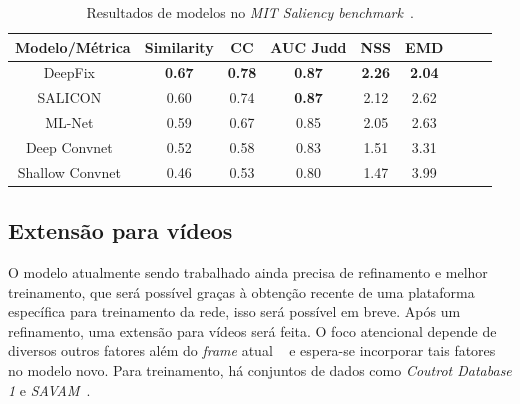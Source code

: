 \documentclass[11pt]{article}
\newcommand{\tit}[1]{\textit{#1}}
\newcommand{\tbf}[1]{\textbf{#1}}
\begin{document}
\begin{table}[H]
    \centering
    \caption{Resultados de modelos no \tit{MIT Saliency benchmark}~\cite{ref:mit300-bm}.}
    \begin{tabular}{|c|c|c|c|c|c|c|c|c|}
        \hline
        \tbf{Modelo/Métrica} & \tbf{Similarity} & \tbf{CC}
            & \tbf{AUC Judd} & \tbf{NSS} & \tbf{EMD}\\
        \hline
        DeepFix~\cite{ref:deepfix} & \tbf{0.67} & \tbf{0.78} &
            \tbf{0.87} & \tbf{2.26} & \tbf{2.04}\\
        \hline
        SALICON~\cite{ref:salicon} & 0.60 & 0.74 &
            \tbf{0.87} & 2.12 & 2.62\\
        \hline
        ML-Net~\cite{ref:mlnet} & 0.59 & 0.67 &  0.85 & 2.05 & 2.63\\
        \hline
        Deep Convnet~\cite{ref:shallow-deep} & 0.52 & 0.58 &  0.83 &
            1.51 & 3.31\\
        \hline
        Shallow Convnet~\cite{ref:shallow-deep} & 0.46 & 0.53 &  0.80
            & 1.47 & 3.99\\
        \hline
    \end{tabular}
\end{table}

\subsection{Extensão para vídeos}
O modelo atualmente sendo trabalhado ainda precisa de refinamento e melhor
treinamento, que será possível graças à
obtenção recente de uma plataforma específica para treinamento da rede,
isso será possível em breve.
Após um refinamento, uma extensão para vídeos será feita.
O foco atencional depende de diversos outros fatores além do \tit{frame} atual
~\cite{ref:esther-thesis} e espera-se incorporar tais fatores no modelo novo.
Para treinamento, há conjuntos de dados como
\tit{Coutrot Database 1} e
\tit{SAVAM}~\cite{ref:videos}.
\end{document}
